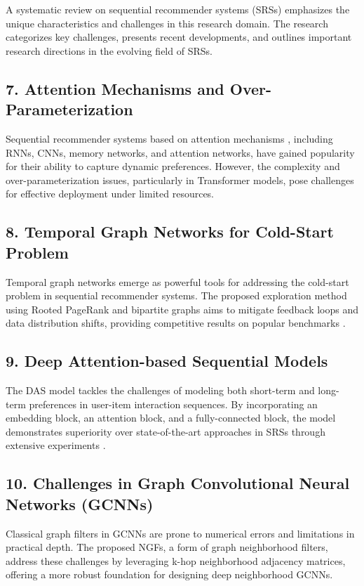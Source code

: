 \documentclass[journal]{IEEEtran}
\begin{document}
A systematic review on sequential recommender systems (SRSs) emphasizes the unique characteristics and challenges \cite{Wang_2019} in this research 
domain. The research categorizes key challenges, presents recent developments, and outlines important research directions in the 
evolving field of SRSs.

\subsection*{7. Attention Mechanisms and Over-Parameterization}

Sequential recommender systems based on attention mechanisms \cite{9123874}, including RNNs, CNNs, memory networks, and attention networks, have 
gained popularity for their ability to capture dynamic preferences. However, the complexity and over-parameterization issues, 
particularly in Transformer models, pose challenges for effective deployment under limited resources.

\subsection*{8. Temporal Graph Networks for Cold-Start Problem}

Temporal graph networks emerge as powerful tools for addressing the cold-start problem in sequential recommender systems. The 
proposed exploration method using Rooted PageRank and bipartite graphs aims to mitigate feedback loops and data distribution shifts, 
providing competitive results on popular benchmarks \cite{9963919}.

\subsection*{9. Deep Attention-based Sequential Models}

The DAS model tackles the challenges of modeling both short-term and long-term preferences in user-item interaction sequences. 
By incorporating an embedding block, an attention block, and a fully-connected block, the model demonstrates superiority over 
state-of-the-art approaches in SRSs through extensive experiments \cite{9123874}.

\subsection*{10. Challenges in Graph Convolutional Neural Networks (GCNNs)}

Classical graph filters in GCNNs are prone to numerical errors and limitations in practical depth. The proposed NGFs, 
a form of graph neighborhood filters, address these challenges by leveraging k-hop neighborhood adjacency matrices, offering a 
more robust foundation for designing deep neighborhood GCNNs.
\end{document}
